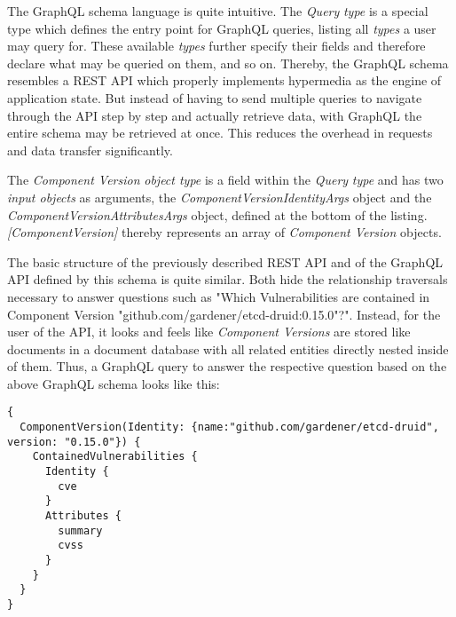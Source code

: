 The GraphQL schema language is quite intuitive. The \emph{Query} \emph{type} is a special type which defines the entry point for GraphQL queries, listing all \emph{types} a user may query for. These available \emph{types} further specify their fields and therefore declare what may be queried on them, and so on. Thereby, the GraphQL schema resembles a REST API which properly implements hypermedia as the engine of application state. But instead of having to send multiple queries to navigate through the API step by step and actually retrieve data, with GraphQL the entire schema may be retrieved at once. This reduces the overhead in requests and data transfer significantly.\par
The \emph{Component Version} \emph{object type} is a field within the \emph{Query} \emph{type} and has two \emph{ input objects} as arguments, the \emph{ComponentVersionIdentityArgs} object and the \emph{ComponentVersionAttributesArgs} object, defined at the bottom of the listing. \emph{[ComponentVersion]} thereby represents an array of \emph{Component Version} objects.\par 
The basic structure of the previously described REST API and of the GraphQL API defined by this schema is quite similar. Both hide the relationship traversals necessary to answer questions such as "Which Vulnerabilities are contained in Component Version "github.com/gardener/etcd-druid:0.15.0"?". Instead, for the user of the API, it looks and feels like \emph{Component Versions} are stored like documents in a document database with all related entities directly nested inside of them. Thus, a GraphQL query to answer the respective question based on the above GraphQL schema looks like this:

\begin{lstlisting}[basicstyle=\tiny,  caption=GraphQL Query, captionpos=b, label=lst:GraphQLQuery]
{
  ComponentVersion(Identity: {name:"github.com/gardener/etcd-druid", version: "0.15.0"}) {
    ContainedVulnerabilities {
      Identity {
        cve
      }
      Attributes {
        summary
        cvss 
      }
    }
  }
}
\end{lstlisting}

